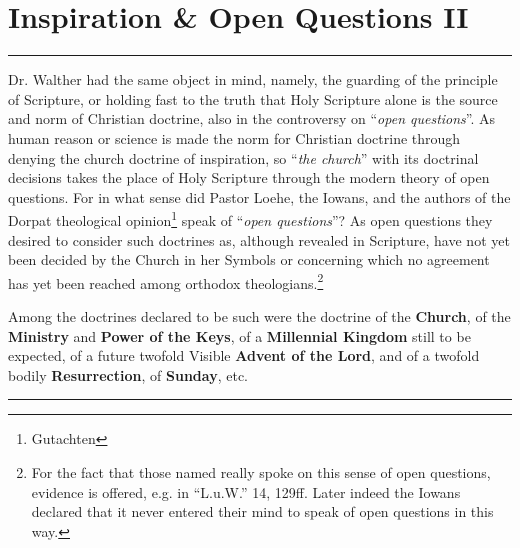 \chapter{Inspiration \& Open Questions II}

\hrule
\vspace{.30cm}
Dr. Walther had the same object in mind, namely, the guarding of the principle of Scripture, or holding fast to the truth that Holy Scripture alone is the source and norm of  Christian doctrine, also in the controversy on “\textit{open questions}”.  As human reason or science is made the norm for Christian doctrine through denying the church doctrine of inspiration, so “\textit{the church}” with its doctrinal decisions takes the place of Holy Scripture through the modern theory of open questions.  For in what sense did Pastor Loehe, the Iowans, and the authors of the Dorpat theological opinion\footnote{Gutachten} speak of “\textit{open questions}”?  As open questions they desired to consider such doctrines as, although revealed in Scripture, have not yet been decided by the Church in her Symbols or concerning which no agreement has yet been reached among orthodox theologians.\footnote{For the fact that those named really spoke on this sense of open questions, evidence is offered, e.g. in “L.u.W.” 14, 129ff.  Later indeed the Iowans declared that it never entered their mind to speak of open questions in this way.}  \par Among the doctrines declared to be such were the doctrine of the \textbf{Church}, of the \textbf{Ministry} and \textbf{Power of the Keys}, of a \textbf{Millennial Kingdom} still to be expected, of a future twofold Visible \textbf{Advent of the Lord}, and of a twofold bodily \textbf{Resurrection}, of \textbf{Sunday}, etc.

\vspace{.10cm}
\hrule
\vspace{1.25cm}


